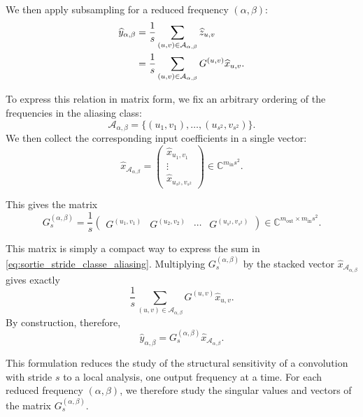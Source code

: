 We then apply subsampling for a reduced frequency $(\alpha,\beta)$:
\begin{align}
    \widehat{y}_{\alpha,\beta}
    &=
    \frac{1}{s}
    \sum_{(u,v)\in\mathcal{A}_{\alpha,\beta}}
    \widehat{z}_{u,v} \notag \\
    &=
    \frac{1}{s}
    \sum_{(u,v)\in\mathcal{A}_{\alpha,\beta}}
    G^{(u,v)}\widehat{x}_{u,v}.
    \label{eq:sortie_stride_classe_aliasing}
\end{align}

To express this relation in matrix form, we fix an arbitrary ordering of the frequencies in
the aliasing class:
\[
    \mathcal{A}_{\alpha,\beta}
    =
    \{(u_1,v_1),\dots,(u_{s^2},v_{s^2})\}.
\]
We then collect the corresponding input coefficients in a single vector:
\[
    \widehat{x}_{\mathcal{A}_{\alpha,\beta}}
    =
    \begin{pmatrix}
        \widehat{x}_{u_1,v_1} \\
        \vdots \\
        \widehat{x}_{u_{s^2},v_{s^2}}
    \end{pmatrix}
    \in \mathbb{C}^{m_{\mathrm{in}}s^2}.
\]

This gives the matrix
\begin{equation}
    G_s^{(\alpha,\beta)}
    =
    \frac{1}{s}
    \begin{pmatrix}
        G^{(u_1,v_1)}
        &
        G^{(u_2,v_2)}
        &
        \cdots
        &
        G^{(u_{s^2},v_{s^2})}
    \end{pmatrix}
    \in
    \mathbb{C}^{m_{\mathrm{out}}\times m_{\mathrm{in}}s^2}.
    \label{eq:def_matrice_aliasing_stride}
\end{equation}

This matrix is simply a compact way to express the sum in
\eqref{eq:sortie_stride_classe_aliasing}. Multiplying
$G_s^{(\alpha,\beta)}$ by the stacked vector
$\widehat{x}_{\mathcal{A}_{\alpha,\beta}}$ gives exactly
\[
    \frac{1}{s}
    \sum_{(u,v)\in\mathcal{A}_{\alpha,\beta}}
    G^{(u,v)}\widehat{x}_{u,v}.
\]
By construction, therefore,
\begin{equation*}
    \widehat{y}_{\alpha,\beta}
    =
    G_s^{(\alpha,\beta)}
    \widehat{x}_{\mathcal{A}_{\alpha,\beta}}.
\end{equation*}

This formulation reduces the study of the structural sensitivity of a convolution with stride $s$ to
a local analysis, one output frequency at a time. For each reduced frequency $(\alpha,\beta)$,
we therefore study the singular values and vectors of the matrix $G_s^{(\alpha,\beta)}$.

